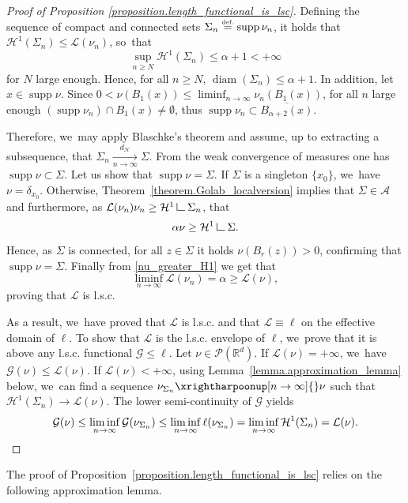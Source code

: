\documentclass[10pt]{amsart}
\theoremstyle{definition}
\newcommand{\eqdef}{\ensuremath{\stackrel{\mbox{\upshape\tiny def.}}{=}}}
\newcommand\LM[1]{\hbox{\vrule width.5pt \vbox to#1pt{\vfill \hrule width#1pt height.5pt}}}
\newcommand\LL{{\mathchoice {\>\LM7\>}{\>\LM7\>}{\,\LM5\,}{\,\LM{3.35}\,}}}
\newcommand{\mres}{\LL}
\newcommand\G{\mathcal{G}}
\newcommand\cH{\mathcal{H}}
\newcommand{\RR}{\mathbb{R}}
\DeclareMathOperator{\diam}{diam}
\DeclareMathOperator{\supp}{supp}
\newcommand{\distH}{d_{\mathcal{H}}}
\begin{document}
\begin{proof}[Proof of Proposition \ref{proposition.length_functional_is_lsc}]
Defining the sequence of compact and connected sets $\Sigma_n \eqdef \supp \nu_n$, it holds that $\cH^1(\Sigma_n) \le \mathcal{L}(\nu_n)$, so~that
\[
\sup_{n\geq N} \cH^1(\Sigma_n) \leq \alpha +1 <+\infty
\]
for $N$ large enough. Hence, for all $n\ge N$, $\diam(\Sigma_n)\leq \alpha +1$. In addition, let $x\in \supp \nu$. Since $0<\nu(B_1(x))\leq \liminf_{n\to \infty}\nu_n(B_1(x))$, for all $n$ large enough $\left(\supp \nu_n\right)\cap B_1(x)\neq \emptyset$, thus $\supp \nu_n \subset \overline{B_{\alpha+2}(x)}$.

Therefore, we~may apply Blaschke's theorem and assume,
up to extracting a subsequence, that $\Sigma_n \xrightarrow[n \to \infty]{\distH} \Sigma$. From the weak convergence of measures one has $\supp \nu \subset \Sigma$. Let us show that $\supp \nu = \Sigma$. If $\Sigma$ is a singleton $\{x_0\}$, we~have $\nu = \delta_{x_0}$. Otherwise, Theorem~\ref{theorem.Golab_localversion} implies that $\Sigma \in \mathcal{A}$ and furthermore, as $\mathcal{L}(\nu_n) \nu_n \ge \cH^1\mres \Sigma_n$, that
\begin{equation}
\label{nu_greater_H1}
\alpha \nu \ge \cH^1\mres \Sigma.
\end{equation}
Hence, as $\Sigma$ is connected, for all $z \!\in\! \Sigma$ it holds $\nu(B_r(z)) \!>\! 0$, confirming that $\supp \nu \!=\! \Sigma$. Finally from \eqref{nu_greater_H1} we get that
\[
\liminf_{n \to \infty} \mathcal{L}(\nu_n)
=
\alpha
\ge
\mathcal{L}(\nu),
\]
proving that $\mathcal{L}$ is l.s.c.

As a result, we~have proved that $\mathcal{L}$ is l.s.c. and that $\mathcal{L}\equiv \ell$ on the effective domain of $\ell$. To show that $\mathcal{L}$ is the l.s.c. envelope of $\ell$, we~prove that it is above any l.s.c. functional $\G \le \ell$. Let $\nu \in \mathcal{P}(\RR^d)$. If $\mathcal{L}(\nu)=+\infty$, we~have $\G(\nu)\leq \mathcal{L}(\nu)$. If $\mathcal{L}(\nu)<+\infty$, using Lemma~\ref{lemma.approximation_lemma} below, we~can find a sequence $\nu_{\Sigma_n} \xrightharpoonup[n \to \infty]{} \nu$ such that $\cH^1(\Sigma_n) \rightarrow \mathcal{L}(\nu)$. The lower semi-continuity of $\G$ yields
\begin{equation*}
\G(\nu) \le \liminf_{n \to \infty} \G(\nu_{\Sigma_n })
\le \liminf_{n \to \infty} \ell(\nu_{\Sigma_n })
= \liminf_{n \to \infty} \cH^1(\Sigma_n)
= \mathcal{L}(\nu).\qedhere
\end{equation*}
\end{proof}

The proof of Proposition~\ref{proposition.length_functional_is_lsc} relies on the following approximation lemma.
\end{document}
